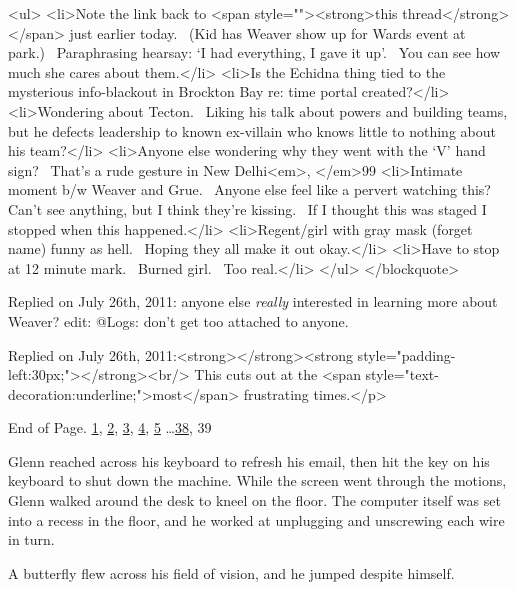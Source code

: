 <ul>
<li>Note the link back to <span style=""><strong>this thread</strong></span> just earlier today.  (Kid has Weaver show up for Wards event at park.)  Paraphrasing hearsay: ‘I had everything, I gave it up’.  You can see how much she cares about them.</li>
<li>Is the Echidna thing tied to the mysterious info-blackout in Brockton Bay re: time portal created?</li>
<li>Wondering about Tecton.  Liking his talk about powers and building teams, but he defects leadership to known ex-villain who knows little to nothing about his team?</li>
<li>Anyone else wondering why they went with the ‘V’ hand sign?  That’s a rude gesture in New Delhi<em>, </em>99%
<li>Intimate moment b/w Weaver and Grue.  Anyone else feel like a pervert watching this?  Can’t see anything, but I think they’re kissing.  If I thought this was staged I stopped when this happened.</li>
<li>Regent/girl with gray mask (forget name) funny as hell.  Hoping they all make it out okay.</li>
<li>Have to stop at 12 minute mark.  Burned girl.  Too real.</li>
</ul>
</blockquote>



\blacktriangleright {}
Replied on July 26th, 2011:
anyone else \emph{really} interested in learning more about Weaver?
edit:  @Logs: don't get too attached to anyone.



Replied on July 26th, 2011:<strong></strong><strong style="padding-left:30px;"></strong><br/>
This cuts out at the <span style="text-decoration:underline;">most</span> frustrating times.</p>



End of Page.   \underline{1}, \underline{2}, \underline{3}, \underline{4}, \underline{5} \ldots \underline{38}, 39



\blacksquare



Glenn reached across his keyboard to refresh his email, then hit the key on his keyboard to shut down the machine.  While the screen went through the motions, Glenn walked around the desk to kneel on the floor.  The computer itself was set into a recess in the floor, and he worked at unplugging and unscrewing each wire in turn.



A butterfly flew across his field of vision, and he jumped despite himself.




